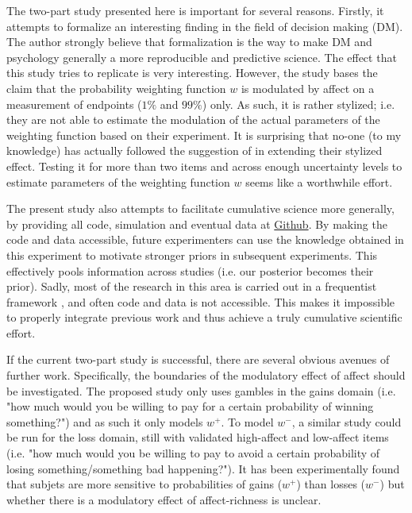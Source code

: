 \documentclass[12pt]{article}
\begin{document}
The two-part study presented here is important
for several reasons. Firstly, it attempts to
formalize an interesting finding in the
field of decision making (DM). The author
strongly believe that formalization is the way to
make DM and psychology generally a more
reproducible and predictive science.
The effect that this study tries to replicate
\autocite{rottenstreich2001money} is
very interesting. However, the study
bases the claim that the
probability weighting function $w$ is
modulated by affect on a measurement of endpoints
($1\%$ and $99\%$) only.
As such, it is rather stylized; i.e. they
are not able to estimate the modulation of
the actual parameters of the weighting function
based on their experiment.
It is surprising that no-one (to my knowledge)
has actually followed the suggestion
of \autocite{rottenstreich2001money} in extending
their stylized effect. Testing it for more than
two items and across enough uncertainty
levels to estimate parameters of the weighting
function $w$ seems like a worthwhile effort.

\vspace{3mm}
The present study also attempts to facilitate
cumulative science more generally, by providing
all code, simulation and eventual data at
\href{https://github.com/victor-m-p/BayesianDecisionWeights}
{Github}.
By making the code and data accessible, future
experimenters can use the knowledge obtained in
this experiment to motivate stronger priors in
subsequent experiments. This effectively
pools information across studies
(i.e. our posterior becomes their prior). Sadly,
most of the research in this area is carried
out in a frequentist framework
\autocite{gonzalez1999shape, rottenstreich2001money,
hsee2004music}, and often
code and data is not accessible. This makes it
impossible to properly integrate previous work
and thus achieve a truly cumulative scientific effort.

\vspace{3mm}
If the current two-part study is successful,
there are several obvious avenues of further
work. Specifically, the boundaries of the modulatory
effect of affect should be investigated. The
proposed study
only uses gambles in the gains domain (i.e. "how
much would you be willing to pay for a
certain probability of winning something?")
and as such it only models $w^{+}$. To model
$w^{-}$, a similar
study could be run for the loss domain, still with
validated high-affect and low-affect items (i.e. "how
much would you be willing to pay to avoid a
certain probability of losing something/something
bad happening?"). It has been experimentally
found that subjets are more sensitive to
probabilities of gains ($w^{+}$) than
losses ($w^{-}$) \autocite{
abdellaoui2010separating} but whether there is a
modulatory effect of affect-richness is unclear.\\
\end{document}
